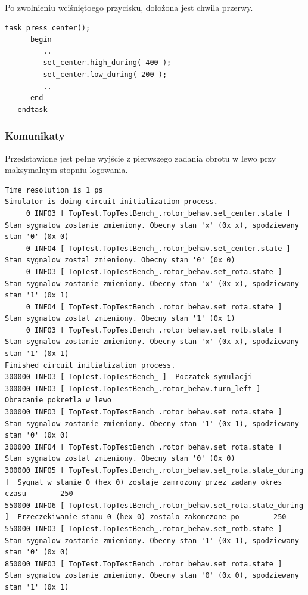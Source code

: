 \documentclass[a4paper,12pt]{article}
\begin{document}
Po zwolnieniu wciśniętoego przycisku, dołożona jest chwila przerwy.
\begin{lstlisting}[label=Rotor_behav,caption=Rotor\_behav.v]
   task press_center();
      begin
         ..
         set_center.high_during( 400 );
         set_center.low_during( 200 );
         ..
      end
   endtask
\end{lstlisting}

\subsubsection{Komunikaty}

Przedstawione jest pełne wyjście z pierwszego zadania obrotu w lewo przy maksymalnym stopniu logowania.

\begin{lstlisting}
Time resolution is 1 ps
Simulator is doing circuit initialization process.
     0 INFO3 [ TopTest.TopTestBench_.rotor_behav.set_center.state ]  Stan sygnalow zostanie zmieniony. Obecny stan 'x' (0x x), spodziewany stan '0' (0x 0)
     0 INFO4 [ TopTest.TopTestBench_.rotor_behav.set_center.state ]  Stan sygnalow zostal zmieniony. Obecny stan '0' (0x 0)
     0 INFO3 [ TopTest.TopTestBench_.rotor_behav.set_rota.state ]  Stan sygnalow zostanie zmieniony. Obecny stan 'x' (0x x), spodziewany stan '1' (0x 1)
     0 INFO4 [ TopTest.TopTestBench_.rotor_behav.set_rota.state ]  Stan sygnalow zostal zmieniony. Obecny stan '1' (0x 1)
     0 INFO3 [ TopTest.TopTestBench_.rotor_behav.set_rotb.state ]  Stan sygnalow zostanie zmieniony. Obecny stan 'x' (0x x), spodziewany stan '1' (0x 1)
Finished circuit initialization process.
300000 INFO3 [ TopTest.TopTestBench_ ]  Poczatek symulacji
300000 INFO3 [ TopTest.TopTestBench_.rotor_behav.turn_left ]  Obracanie pokretla w lewo
300000 INFO3 [ TopTest.TopTestBench_.rotor_behav.set_rota.state ]  Stan sygnalow zostanie zmieniony. Obecny stan '1' (0x 1), spodziewany stan '0' (0x 0)
300000 INFO4 [ TopTest.TopTestBench_.rotor_behav.set_rota.state ]  Stan sygnalow zostal zmieniony. Obecny stan '0' (0x 0)
300000 INFO5 [ TopTest.TopTestBench_.rotor_behav.set_rota.state_during ]  Sygnal w stanie 0 (hex 0) zostaje zamrozony przez zadany okres czasu        250
550000 INFO6 [ TopTest.TopTestBench_.rotor_behav.set_rota.state_during ]  Przeczekiwanie stanu 0 (hex 0) zostalo zakonczone po        250
550000 INFO3 [ TopTest.TopTestBench_.rotor_behav.set_rotb.state ]  Stan sygnalow zostanie zmieniony. Obecny stan '1' (0x 1), spodziewany stan '0' (0x 0)
850000 INFO3 [ TopTest.TopTestBench_.rotor_behav.set_rota.state ]  Stan sygnalow zostanie zmieniony. Obecny stan '0' (0x 0), spodziewany stan '1' (0x 1)

\end{lstlisting}
\end{document}
